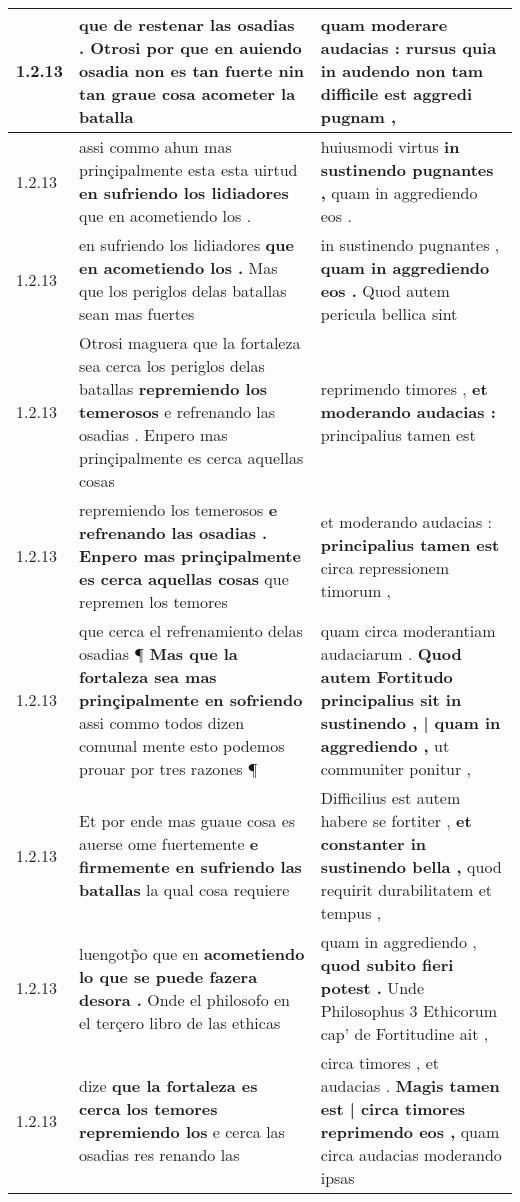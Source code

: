 \begin{tabular}{|p{1cm}|p{6.5cm}|p{6.5cm}|}
1.2.13 & que de restenar las osadias . \textbf{ Otrosi por que en auiendo osadia } non es tan fuerte nin tan graue cosa acometer la batalla & quam moderare audacias : \textbf{ rursus quia in audendo } non tam difficile est aggredi pugnam , \\\hline
1.2.13 & assi commo ahun mas prinçipalmente esta esta uirtud \textbf{ en sufriendo los lidiadores } que en acometiendo los . & huiusmodi virtus \textbf{ in sustinendo pugnantes , } quam in aggrediendo eos . \\\hline
1.2.13 & en sufriendo los lidiadores \textbf{ que en acometiendo los . } Mas que los periglos delas batallas sean mas fuertes & in sustinendo pugnantes , \textbf{ quam in aggrediendo eos . } Quod autem pericula bellica sint \\\hline
1.2.13 & Otrosi maguera que la fortaleza sea cerca los periglos delas batallas \textbf{ repremiendo los temerosos } e refrenando las osadias . Enpero mas prinçipalmente es cerca aquellas cosas & reprimendo timores , \textbf{ et moderando audacias : } principalius tamen est \\\hline
1.2.13 & repremiendo los temerosos \textbf{ e refrenando las osadias . Enpero mas prinçipalmente es cerca aquellas cosas } que repremen los temores & et moderando audacias : \textbf{ principalius tamen est } circa repressionem timorum , \\\hline
1.2.13 & que cerca el refrenamiento delas osadias ¶ \textbf{ Mas que la fortaleza sea mas prinçipalmente en sofriendo } assi commo todos dizen comunal mente esto podemos prouar por tres razones ¶ & quam circa moderantiam audaciarum . \textbf{ Quod autem Fortitudo principalius sit in sustinendo , | quam in aggrediendo , } ut communiter ponitur , \\\hline
1.2.13 & Et por ende mas guaue cosa es auerse ome fuertemente \textbf{ e firmemente en sufriendo las batallas } la qual cosa requiere & Difficilius est autem habere se fortiter , \textbf{ et constanter in sustinendo bella , } quod requirit durabilitatem et tempus , \\\hline
1.2.13 & luengotp̃o que en \textbf{ acometiendo lo que se puede fazera desora . } Onde el philosofo en el terçero libro de las ethicas & quam in aggrediendo , \textbf{ quod subito fieri potest . } Unde Philosophus 3 Ethicorum cap’ de Fortitudine ait , \\\hline
1.2.13 & dize \textbf{ que la fortaleza es cerca los temores repremiendo los } e cerca las osadias res renando las & circa timores , et audacias . \textbf{ Magis tamen est | circa timores reprimendo eos , } quam circa audacias moderando ipsas \\\hline

\end{tabular}
